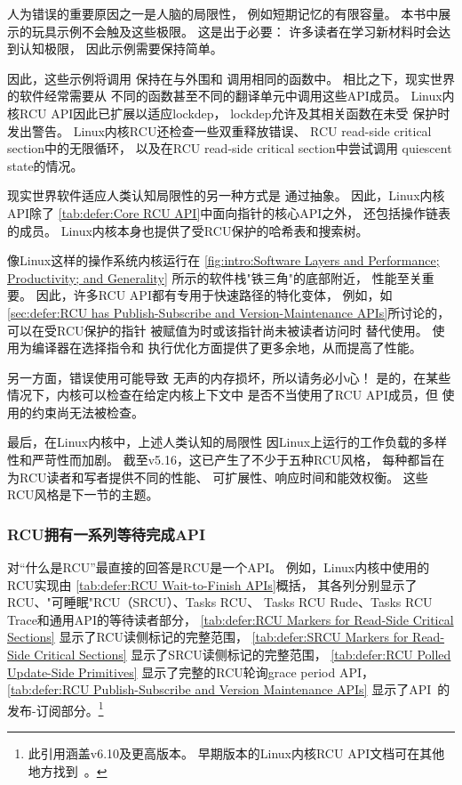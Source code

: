 人为错误的重要原因之一是人脑的局限性，
例如短期记忆的有限容量。
本书中展示的玩具示例不会触及这些极限。
这是出于必要：
许多读者在学习新材料时会达到认知极限，
因此示例需要保持简单。

因此，这些示例将调用
保持在与外围和
调用相同的函数中。
相比之下，现实世界的软件经常需要从
不同的函数甚至不同的翻译单元中调用这些API成员。
Linux内核RCU API因此已扩展以适应lockdep，
lockdep允许及其相关函数在未受
保护时发出警告。
Linux内核RCU还检查一些双重释放错误、
RCU read-side critical section中的无限循环，
以及在RCU read-side critical section中尝试调用
quiescent state的情况。

现实世界软件适应人类认知局限性的另一种方式是
通过抽象。
因此，Linux内核API除了
\cref{tab:defer:Core RCU API}中面向指针的核心API之外，
还包括操作链表的成员。
Linux内核本身也提供了受RCU保护的哈希表和搜索树。

像Linux这样的操作系统内核运行在
\cref{fig:intro:Software Layers and Performance; Productivity; and Generality}
所示的软件栈"铁三角"的底部附近，
性能至关重要。
因此，许多RCU API都有专用于快速路径的特化变体，
例如，如
\cref{sec:defer:RCU has Publish-Subscribe and Version-Maintenance APIs}所讨论的，
可以在受RCU保护的指针
被赋值为时或该指针尚未被读者访问时
替代使用。
使用为编译器在选择指令和
执行优化方面提供了更多余地，从而提高了性能。

另一方面，错误使用可能导致
无声的内存损坏，所以请务必小心！
是的，在某些情况下，内核可以检查在给定内核上下文中
是否不当使用了RCU API成员，但
使用的约束尚无法被检查。

最后，在Linux内核中，上述人类认知的局限性
因Linux上运行的工作负载的多样性和严苛性而加剧。
截至v5.16，这已产生了不少于五种RCU风格，
每种都旨在为RCU读者和写者提供不同的性能、
可扩展性、响应时间和能效权衡。
这些RCU风格是下一节的主题。

\subsubsection{RCU拥有一系列等待完成API}
\label{sec:defer:RCU has a Family of Wait-to-Finish APIs}

对``什么是RCU''最直接的回答是RCU是一个API。
例如，Linux内核中使用的RCU实现由
\cref{tab:defer:RCU Wait-to-Finish APIs}概括，
其各列分别显示了RCU、"可睡眠"RCU（SRCU）、Tasks RCU、
Tasks RCU Rude、Tasks RCU Trace和通用API的等待读者部分，
\cref{tab:defer:RCU Markers for Read-Side Critical Sections}
显示了RCU读侧标记的完整范围，
\cref{tab:defer:SRCU Markers for Read-Side Critical Sections}
显示了SRCU读侧标记的完整范围，
\cref{tab:defer:RCU Polled Update-Side Primitives}
显示了完整的RCU轮询grace period API，
\cref{tab:defer:RCU Publish-Subscribe and Version Maintenance APIs}
显示了API~\cite{PaulEMcKenney2024RCUAPI}的发布-订阅部分。\footnote{
	此引用涵盖v6.10及更高版本。
	早期版本的Linux内核RCU API文档可在其他地方找到~\cite{PaulEMcKenney2008WhatIsRCUAPI,PaulEMcKenney2014RCUAPI,PaulEMcKenney2019RCUAPI}。}

